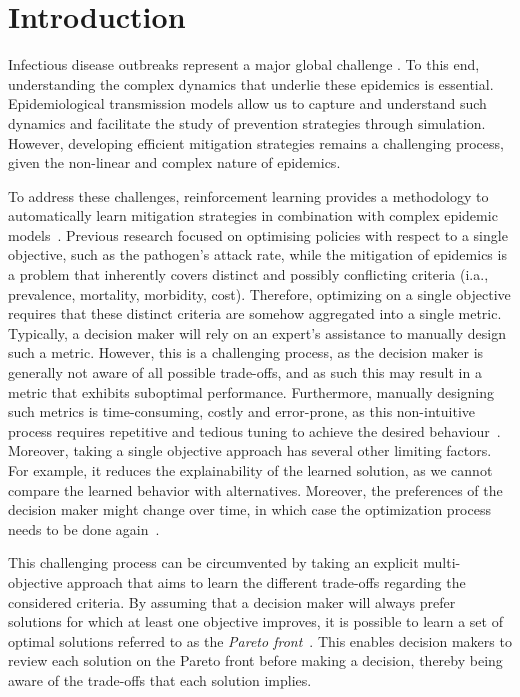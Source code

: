 \documentclass{article}
\renewcommand{\cite}[1]{\citep{#1}}
\begin{document}
\section{Introduction}
Infectious disease outbreaks represent a major global challenge \cite{miranda2022tale}. To this end, understanding the complex dynamics that underlie these epidemics is essential. Epidemiological transmission models allow us to capture and understand such dynamics and facilitate the study of prevention strategies through simulation. However, developing efficient mitigation strategies remains a challenging process, given the non-linear and complex nature of epidemics. 

To address these challenges, reinforcement learning provides a methodology to automatically learn mitigation strategies in combination with complex epidemic models~\cite{libin2020}.
Previous research focused on optimising policies with respect to a single objective, such as the pathogen's attack rate, while the mitigation of epidemics is a problem that inherently covers distinct  and possibly conflicting criteria (i.a., prevalence, mortality, morbidity, cost). Therefore, optimizing on a single objective requires that  these distinct criteria are somehow aggregated into a single metric.
Typically, a decision maker will rely on an expert's assistance to manually design such a metric. However, this is a challenging process, as the decision maker is generally not aware of all possible trade-offs, and as such this may result in a metric that exhibits suboptimal performance. Furthermore, manually designing such metrics is time-consuming, costly and error-prone, as this non-intuitive process requires repetitive and tedious tuning to achieve the desired behaviour~\cite{roijers2013survey}. Moreover, taking a single objective approach has several other limiting factors. For example, it reduces the explainability of the learned solution, as we cannot compare the learned behavior with alternatives. Moreover, the preferences of the decision maker might change over time, in which case the optimization process needs to be done again~\cite{hayes2021practical}. 

This challenging process can be circumvented by taking an explicit multi-objective approach that aims to learn the different trade-offs regarding the considered criteria. By assuming that a decision maker will always prefer solutions for which at least one objective improves, it is possible to learn a set of optimal solutions referred to as the \emph{Pareto front}~\cite{hayes2021practical}. This enables decision makers to review each solution on the Pareto front before making a decision, thereby being aware of the trade-offs that each solution implies. 
\end{document}
